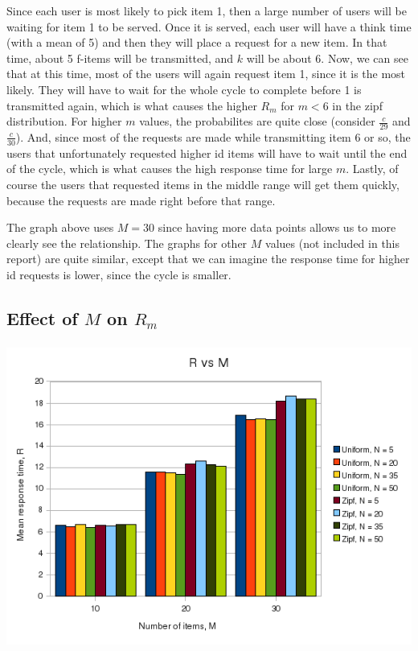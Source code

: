 \documentclass[12pt]{article}
\begin{document}
Since each user is most likely to pick item 1, then a large number of users will
be waiting for item 1 to be served.  Once it is served, each user will have a
think time (with a mean of 5) and then they will place a request for a new item.
In that time, about 5 f-items will be transmitted, and $k$ will be about 6.
Now, we can see that at this time, most of the users will again request item 1,
since it is the most likely.  They will have to wait for the whole cycle to
complete before 1 is transmitted again, which is what causes the higher $R_m$
for $m < 6$ in the zipf distribution.  For higher $m$ values, the probabilites
are quite close (consider $\frac{c}{29}$ and $\frac{c}{30}$).  And, since most
of the requests are made while transmitting item 6 or so, the users that
unfortunately requested higher id items will have to wait until the end of the
cycle, which is what causes the high response time for large $m$.  Lastly, of
course the users that requested items in the middle range will get them quickly,
because the requests are made right before that range.

The graph above uses $M = 30$ since having more data points allows us to more
clearly see the relationship.  The graphs for other $M$ values (not included in
this report) are quite similar, except that we can imagine the response time for
higher id requests is lower, since the cycle is smaller.


\newpage
\begin{table}[htp!]
\subsection{Effect of $M$ on $R_m$}
\begin{center}
\includegraphics[height=10cm]{R_vs_M.png}
\end{center}
\end{table}
\end{document}
